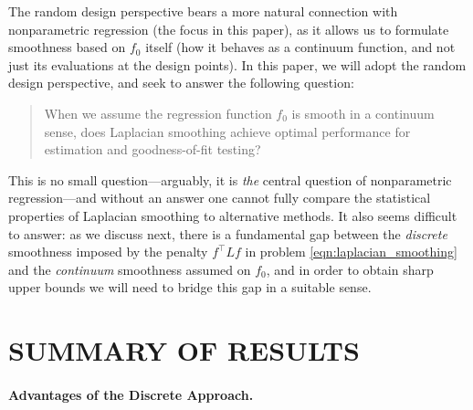 \documentclass[twoside]{article}
\newcommand{\1}{\mathbf{1}}
\newcommand{\Lap}{L}
\theoremstyle{definition}
\theoremstyle{remark}
\begin{document}
The random design perspective bears a more natural connection with nonparametric regression (the focus in this paper), as it allows us to formulate smoothness based on $f_0$ itself (how it behaves as a continuum function, and not just its evaluations at the design points). In this paper, we will adopt the random design perspective, and seek to answer the following question:
\begin{quote}{When we assume the regression function $f_0$ is smooth in a continuum sense, does Laplacian smoothing achieve optimal performance for estimation and goodness-of-fit testing?} 
\end{quote}
This is no small question---arguably, it is \emph{the} central question of nonparametric regression---and without an answer one cannot fully compare the statistical properties of Laplacian smoothing to alternative methods. It also seems difficult to answer: as we discuss next, there is a fundamental gap between the \emph{discrete} smoothness imposed by the penalty $f^\top \Lap f$ in problem \eqref{eqn:laplacian_smoothing} and the \emph{continuum} smoothness assumed on $f_0$, and in order to obtain sharp upper bounds we will need to bridge this gap in a suitable sense.

\section{SUMMARY OF RESULTS}
\label{sec:summary}

\paragraph{Advantages of the Discrete Approach.} 
\end{document}
